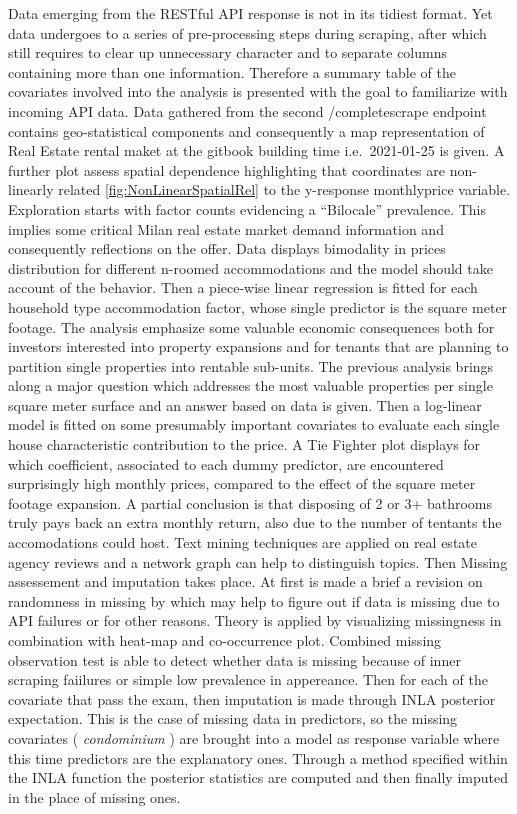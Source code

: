\documentclass[
  12pt,
  a4paper,
  oneside]{book}
\theoremstyle{definition}
\theoremstyle{definition}
\theoremstyle{definition}
\theoremstyle{remark}
\begin{document}
Data emerging from the RESTful API response is not in its tidiest format. Yet data undergoes to a series of pre-processing steps during scraping, after which still requires to clear up unnecessary character and to separate columns containing more than one information. Therefore a summary table of the covariates involved into the analysis is presented with the goal to familiarize with incoming API data. Data gathered from the second /completescrape endpoint contains geo-statistical components and consequently a map representation of Real Estate rental maket at the gitbook building time i.e.~2021-01-25 is given. A further plot assess spatial dependence highlighting that coordinates are non-linearly related \ref{fig:NonLinearSpatialRel} to the y-response monthlyprice variable. Exploration starts with factor counts evidencing a ``Bilocale'' prevalence. This implies some critical Milan real estate market demand information and consequently reflections on the offer. Data displays bimodality in prices distribution for different n-roomed accommodations and the model should take account of the behavior. Then a piece-wise linear regression is fitted for each household type accommodation factor, whose single predictor is the square meter footage. The analysis emphasize some valuable economic consequences both for investors interested into property expansions and for tenants that are planning to partition single properties into rentable sub-units. The previous analysis brings along a major question which addresses the most valuable properties per single square meter surface and an answer based on data is given. Then a log-linear model is fitted on some presumably important covariates to evaluate each single house characteristic contribution to the price. A Tie Fighter plot displays for which coefficient, associated to each dummy predictor, are encountered surprisingly high monthly prices, compared to the effect of the square meter footage expansion. A partial conclusion is that disposing of 2 or 3+ bathrooms truly pays back an extra monthly return, also due to the number of tentants the accomodations could host. Text mining techniques are applied on real estate agency reviews and a network graph can help to distinguish topics. Then Missing assessement and imputation takes place. At first is made a brief a revision on randomness in missing by \citet{Little} which may help to figure out if data is missing due to API failures or for other reasons. Theory is applied by visualizing missingness in combination with heat-map and co-occurrence plot. Combined missing observation test is able to detect whether data is missing because of inner scraping faiilures or simple low prevalence in appereance. Then for each of the covariate that pass the exam, then imputation is made through INLA posterior expectation. This is the case of missing data in predictors, so the missing covariates ( \emph{condominium} ) are brought into a model as response variable where this time predictors are the explanatory ones. Through a method specified within the INLA function the posterior statistics are computed and then finally imputed in the place of missing ones.
\end{document}
